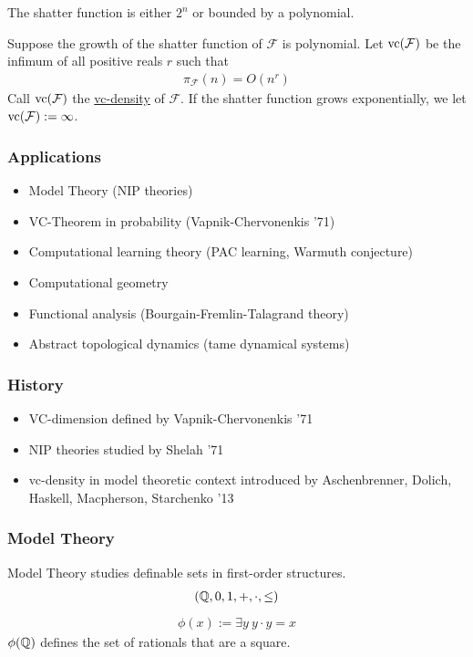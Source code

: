 \documentclass{beamer}
\newcommand{\F}{\mathcal F}
\newcommand{\defn}{\underline}
\begin{document}
\begin{frame}
	\begin{Theorem} 
		The shatter function is either $2^n$ or bounded by a polynomial.
	\end{Theorem}
	\begin{Definition}
		Suppose the growth of the shatter function of $\F$ is polynomial.
		Let $\vc(\F)$ be the infimum of all positive reals $r$ such that
		\begin{align*}
			\pi_\F(n) = O(n^r)
		\end{align*}
		Call $\vc(\F)$ the \defn{vc-density} of $\F$.
		If the shatter function grows exponentially, we let $\vc(\F) := \infty$.
	\end{Definition}
\end{frame}

\begin{frame}
	\frametitle{Applications}
	\begin{itemize}
		\item Model Theory (NIP theories)
		\item VC-Theorem in probability (Vapnik-Chervonenkis '71)
		\item Computational learning theory (PAC learning, Warmuth conjecture)
		\item Computational geometry
		\item Functional analysis (Bourgain-Fremlin-Talagrand theory)
		\item Abstract topological dynamics (tame dynamical systems)
	\end{itemize}
\end{frame}

\begin{frame}
	\frametitle{History}
	\begin{itemize}
		\item VC-dimension defined by Vapnik-Chervonenkis '71
		\item NIP theories studied by Shelah '71
		\item vc-density in model theoretic context introduced by Aschenbrenner, Dolich, Haskell, Macpherson, Starchenko '13
	\end{itemize}
\end{frame}

\begin{frame}
	\frametitle{Model Theory}
	Model Theory studies definable sets in first-order structures.
	\begin{align*}
		(\mathbb{Q}, 0, 1, +, \cdot, \leq)
	\end{align*}
	\begin{align*}
		\phi(x) := \exists y \ y \cdot y = x
	\end{align*}
	$\phi(\mathbb{Q})$ defines the set of rationals that are a square.
\end{frame}
\end{document}
